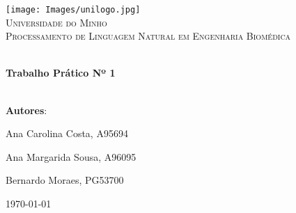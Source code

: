 \begin{titlepage}
\vbox{ }
\begin{center}

\texttt{[image: Images/unilogo.jpg]}\\[1cm]
\textsc{\LARGE Universidade do Minho}\\[1.5cm]
\textsc{\Large Processamento de Linguagem Natural em Engenharia Biomédica}\\[0.5cm]

\vbox{ }

\HRule \\[0.4cm]
{ \Huge \bfseries Trabalho Prático Nº 1}\\[0.4cm]
\HRule \\[1.5cm]

\begin{center}
\LARGE
\textbf{Autores}:
\begin{center}
    Ana Carolina Costa, A95694
\end{center}
\begin{center}
    Ana Margarida Sousa, A96095
\end{center}
\begin{center}
    Bernardo Moraes, PG53700
\end{center}
\end{center}
\vfill
{\large \today}
\end{center}
\end{titlepage}